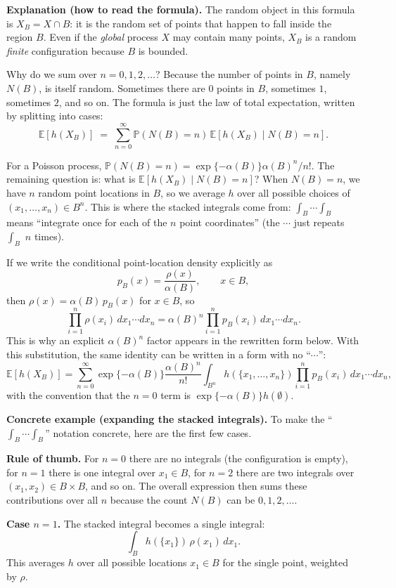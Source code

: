 \noindent\textbf{Explanation (how to read the formula).}
The random object in this formula is $X_B=X\cap B$: it is the random set of points that happen to fall inside the region
$B$. Even if the \emph{global} process $X$ may contain many points, $X_B$ is a random \emph{finite} configuration because
$B$ is bounded.

Why do we sum over $n=0,1,2,\dots$? Because the number of points in $B$, namely $N(B)$, is itself random. Sometimes there
are $0$ points in $B$, sometimes $1$, sometimes $2$, and so on. The formula is just the law of total expectation, written
by splitting into cases:
$$
\mathbb{E}[h(X_B)] \;=\; \sum_{n=0}^{\infty} \mathbb{P}(N(B)=n)\,\mathbb{E}[h(X_B)\mid N(B)=n].
$$

For a Poisson process, $\mathbb{P}(N(B)=n)=\exp\{-\alpha(B)\}\alpha(B)^n/n!$. The remaining question is: what is
$\mathbb{E}[h(X_B)\mid N(B)=n]$? When $N(B)=n$, we have $n$ random point locations in $B$, so we average $h$ over all
possible choices of $(x_1,\dots,x_n)\in B^n$. This is where the stacked integrals come from: $\int_B\cdots\int_B$ means
``integrate once for each of the $n$ point coordinates'' (the $\cdots$ just repeats $\int_B$ $n$ times).

If we write the conditional point-location density explicitly as
$$
p_B(x)=\frac{\rho(x)}{\alpha(B)},\qquad x\in B,
$$
then $\rho(x)=\alpha(B)\,p_B(x)$ for $x\in B$, so
$$
\prod_{i=1}^{n}\rho(x_i)\,dx_1\cdots dx_n
=
\alpha(B)^n\prod_{i=1}^{n}p_B(x_i)\,dx_1\cdots dx_n.
$$
This is why an explicit $\alpha(B)^n$ factor appears in the rewritten form below. With this substitution, the same
identity can be written in a form with no ``$\cdots$'':
$$
\mathbb{E}[h(X_B)]
=
\sum_{n=0}^{\infty}\exp\{-\alpha(B)\}\frac{\alpha(B)^n}{n!}
\int_{B^n} h(\{x_1,\ldots,x_n\})\prod_{i=1}^{n}p_B(x_i)\,dx_1\cdots dx_n,
$$
with the convention that the $n=0$ term is $\exp\{-\alpha(B)\}h(\emptyset)$.

\noindent\textbf{Concrete example (expanding the stacked integrals).}
To make the ``$\int_B\cdots\int_B$'' notation concrete, here are the first few cases.

\noindent\textbf{Rule of thumb.} For $n=0$ there are no integrals (the configuration is empty), for $n=1$ there is one
integral over $x_1\in B$, for $n=2$ there are two integrals over $(x_1,x_2)\in B\times B$, and so on. The overall
expression then sums these contributions over all $n$ because the count $N(B)$ can be $0,1,2,\dots$.

\noindent\textbf{Case $n=1$.} The stacked integral becomes a single integral:
$$
\int_B h(\{x_1\})\,\rho(x_1)\,dx_1.
$$
This averages $h$ over all possible locations $x_1\in B$ for the single point, weighted by $\rho$.

